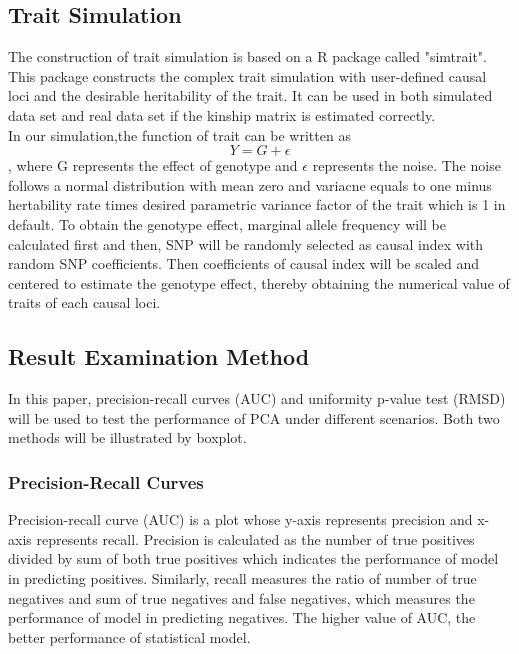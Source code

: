\documentclass[12pt]{article}
\theoremstyle{definition}
\theoremstyle{plain}
\begin{document}
\subsection{Trait Simulation}
The construction of trait simulation is based on a R package called "simtrait". This package constructs the complex trait simulation with user-defined causal loci and the desirable heritability of the trait. It can be used in both simulated data set and real data set if the kinship matrix is estimated correctly. \\
In our simulation,the function of trait can be written as $$Y=G+ \epsilon$$ 
, where G represents the effect of genotype and $\epsilon$ represents the noise.  The noise follows a normal distribution with mean zero and variacne  equals to one minus hertability rate times desired parametric variance factor of the trait which is 1 in default. To obtain the genotype effect, marginal allele frequency will be calculated first and then, SNP will be randomly selected as causal index with random SNP coefficients. Then  coefficients of causal index will be scaled and centered to estimate the genotype effect, thereby obtaining the numerical value of traits of each causal loci.


\subsection{Result Examination Method}
In this paper, precision-recall curves (AUC) and uniformity p-value test (RMSD) will be used to test the performance of PCA under different scenarios. Both two methods will be illustrated by boxplot.
\subsubsection{Precision-Recall Curves}
Precision-recall curve (AUC) is a plot whose y-axis represents precision and x-axis represents recall. Precision is calculated as the number of true positives divided by sum of both true positives which indicates the performance of model in predicting positives. Similarly, recall measures the ratio of number of true negatives and sum of true negatives and false negatives, which measures the performance of model in predicting negatives. The higher value of AUC, the better performance of statistical model.
\end{document}
